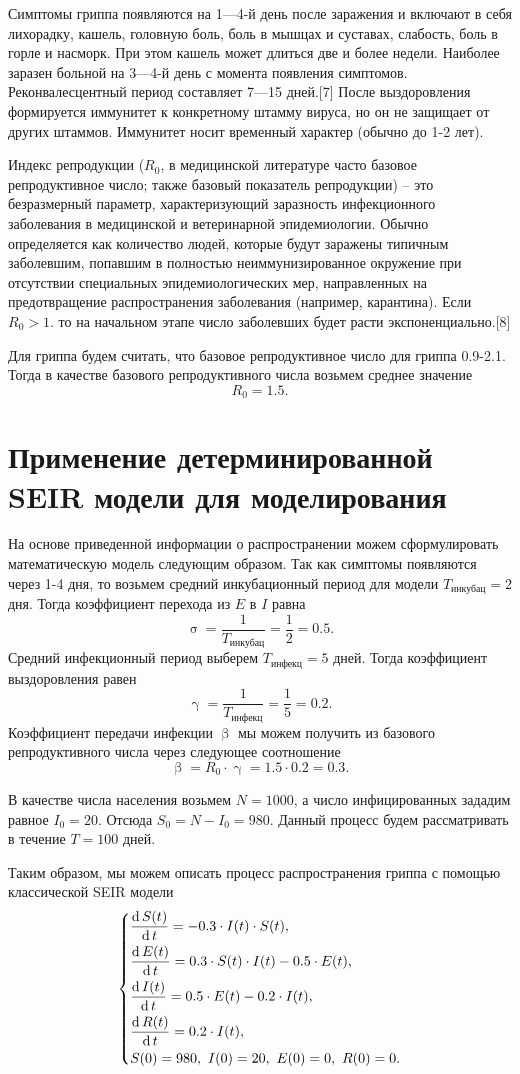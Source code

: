 \documentclass[a4paper, 14pt]{extreport}
\renewcommand{\beta}{\upbeta}
\renewcommand{\gamma}{\upgamma}
\renewcommand{\sigma}{\upsigma}
\renewcommand{\d}{\operatorname{d}}
\begin{document}
	Симптомы гриппа появляются на 1—4-й день после заражения и включают в себя лихорадку, кашель, головную боль, боль в мышцах и суставах, слабость, боль в горле и насморк. При этом кашель может длиться две и более недели. Наиболее заразен больной на 3—4-й день с момента появления симптомов. Реконвалесцентный период составляет 7—15 дней.[7] После выздоровления формируется иммунитет к конкретному штамму вируса, но он не защищает от других штаммов. Иммунитет носит временный характер (обычно до 1-2 лет).
	
	Индекс репродукции ($R_{0}$, в медицинской литературе часто базовое репродуктивное число; также базовый показатель репродукции) -- это безразмерный параметр, характеризующий заразность инфекционного заболевания в медицинской и ветеринарной эпидемиологии. Обычно определяется как количество людей, которые будут заражены типичным заболевшим, попавшим в полностью неиммунизированное окружение при отсутствии специальных эпидемиологических мер, направленных на предотвращение распространения заболевания (например, карантина). Если $R_0 > 1$. то на начальном этапе число заболевших будет расти экспоненциально.[8]
	
	Для гриппа будем считать, что базовое репродуктивное число для гриппа 0.9-2.1. Тогда в качестве базового репродуктивного числа возьмем среднее значение $$R_0 = 1.5.$$
	\section{Применение детерминированной SEIR модели для моделирования}
	На основе приведенной информации о распространении можем сформулировать математическую модель следующим образом. Так как симптомы появляются через 1-4 дня, то возьмем средний инкубационный период для модели $T_\text{инкубац} = 2$ дня. Тогда коэффициент перехода из $E$ в $I$ равна
	$$\sigma = \dfrac{1}{T_\text{инкубац}} = \dfrac 1 2 = 0.5.$$
	Средний инфекционный период выберем $T_\text{инфекц}=5$ дней.
	Тогда коэффициент выздоровления равен
	$$\gamma = \dfrac{1}{T_\text{инфекц}} = \dfrac 1 5 = 0.2.$$
	Коэффициент передачи инфекции $\beta$ мы можем получить из  базового репродуктивного числа через следующее соотношение
	$$\beta = R_0\cdot \gamma = 1.5\cdot 0.2 = 0.3.$$
	
	В качестве числа населения возьмем $N=1000$, а число инфицированных зададим равное $I_0 = 20$. Отсюда $S_0 = N - I_0 = 980$. Данный процесс будем рассматривать в течение $T=100$ дней.
	
	Таким образом, мы можем описать процесс распространения гриппа с помощью классической SEIR модели
	\begin{equation*}
		\begin{dcases}
			\dfrac {\d S(t)}{\d t} = - 0.3 \cdot I(t)\cdot S(t),\\
			\dfrac {\d E(t)}{\d t} = 0.3 \cdot S(t)\cdot I(t) - 0.5\cdot E(t),\\
			\dfrac{\d I(t)}{\d t} =0.5 \cdot E(t) - 0.2\cdot I(t),\\
			\dfrac{\d R(t)}{\d t} = 0.2\cdot I(t),\\
			S(0) = 980,\ I(0) = 20,\ E(0) = 0,\ R(0) = 0.
		\end{dcases}
	\end{equation*} 
	
\end{document}
